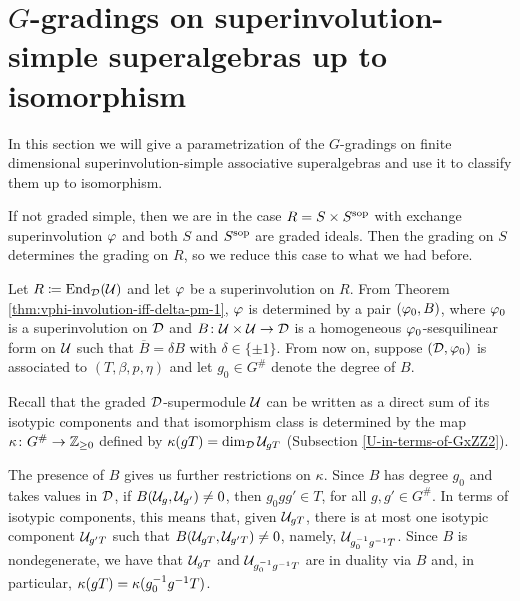 
\section{$G$-gradings on superinvolution-simple superalgebras up to isomorphism}

In this section we will give a parametrization of the $G$-gradings on finite dimensional superinvolution-simple associative superalgebras and use it to classify them up to isomorphism. 

If not graded simple, then we are in the case $R = S\times S^{\mathrm{sop}}$ with exchange superinvolution $\varphi$ and both $S$ and $S^{\mathrm{sop}}$ are graded ideals. 
Then the grading on $S$ determines the grading on $R$, so we reduce this case to what we had before.

Let $R \coloneqq \operatorname{End}_{\mathcal{D}} (\mathcal U)$ and let $\varphi$ be a superinvolution on $R$. 
From Theorem \ref{thm:vphi-involution-iff-delta-pm-1}, $\varphi$ is determined by a pair $(\varphi_0, B)$, where $\varphi_0$ is a superinvolution on $\mathcal{D}$ and $B\colon \mathcal U \times \mathcal U \to \mathcal{D}$ is a homogeneous $\varphi_0$-sesquilinear form on $\mathcal U$ such that $\overline B = \delta B$ with $\delta \in \{ \pm 1 \}$. 
From now on, suppose $(\mathcal{D}, \varphi_0)$ is associated to $(T, \beta, p, \eta)$ and let $g_0\in G^\#$ denote the degree of $B$. 

Recall that the graded $\mathcal{D}$-supermodule $\mathcal U$ can be
written as a direct sum of its isotypic components %
and that isomorphism class is determined by the map $\kappa\colon G^\# \to \mathbb{Z}_{\geq 0}$ defined by $\kappa (gT) = \dim_{\mathcal{D}} \mathcal U_{gT}$ (Subsection \ref{U-in-terms-of-GxZZ2}).

The presence of $B$ gives us further restrictions on $\kappa$. 
Since $B$ has degree $g_0$ and takes values in $\mathcal{D}$, if $B(\mathcal U_{g}, \mathcal U_{g'}) \neq 0$, then $g_0 g g' \in T$, for all $g, g' \in G^\#$. 
In terms of isotypic components, this means that, given $\mathcal U_{g T}$, there is at most one isotypic component $\mathcal U_{g'T}$ such that $B(\mathcal U_{gT}, \mathcal U_{g'T}) \neq 0$, namely, $\mathcal U_{g_0^{-1} g^{-1} T}$. 
Since $B$ is nondegenerate, we have that $\mathcal U_{g T}$ and $\mathcal U_{g_0^{-1} g^{-1} T}$ are in duality via $B$ and, in particular, $\kappa(g T) = \kappa(g_0^{-1} g ^{-1} T)$. 

